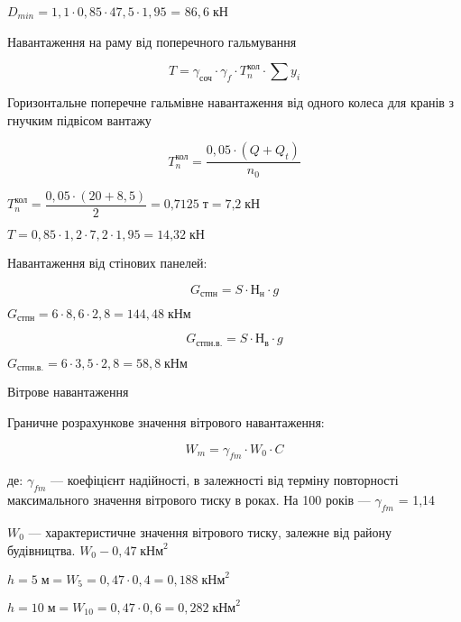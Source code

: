 \documentclass[a4paper,14pt]{article}
\begin{document}
$D_{min}=1,1\cdot 0,85 \cdot 47,5 \cdot 1,95$ = $86,6\;\textit{кН}$

Навантаження на раму від поперечного гальмування

\begin{equation}
    T=\gamma_\textit{соч}\cdot \gamma_f \cdot T^\textit{кол}_{n} \cdot \sum y_i
\end{equation}

Горизонтальне поперечне гальмівне навантаження від одного колеса 
   для кранів з гнучким підвісом вантажу 

\begin{equation}
    T^\textit{кол}_{n}=\dfrac {0,05\cdot (Q+Q_t)}{n_0}
\end{equation}

$T^\textit{кол}_{n}=\dfrac {0,05\cdot (20+8,5)}{2}=\textit{0,7125}\;\textit{т}=\textit{7,2}\;\textit{кН}$

$T=0,85\cdot 1,2 \cdot 7,2 \cdot 1,95 = \textit{14,32}\;\textit{кН}$

Навантаження від стінових панелей:

\begin{equation}
    G_\textit{стпн}= S \cdot Н_\textit{н}\cdot g
\end{equation}

$G_\textit{стпн}= 6 \cdot 8,6\cdot 2,8 = 144,48\;\textit{кНм}$

\begin{equation}
    G_\textit{стпн.в.}= S \cdot Н_\textit{в}\cdot g
\end{equation}

$G_\textit{стпн.в.}= 6 \cdot 3,5\cdot 2,8= 58,8\;\textit{кНм}$

Вітрове навантаження

Граничне розрахункове значення вітрового навантаження:

\begin{equation}
    W_\textit{m}= \gamma_{fm} \cdot W_\textit{0}\cdot C
\end{equation}

де:  $\gamma_{fm}$ ---  коефіцієнт надійності, в залежності від терміну повторності максимального значення вітрового тиску в роках. На 100 років --- $\gamma_{fm}$ = 1,14

$W_\textit{0}$ --- характеристичне значення вітрового тиску, залежне від району будівництва. $W_\textit{0} - 0,47\;\textit{кНм}^2$

$h=5\;\textit{м} = W_{5}= 0,47\cdot 0,4 = 0,188\;\textit{кНм}^2$

$h=10\;\textit{м} = W_{10}= 0,47\cdot 0,6 = 0,282\;\textit{кНм}^2$
\end{document}
